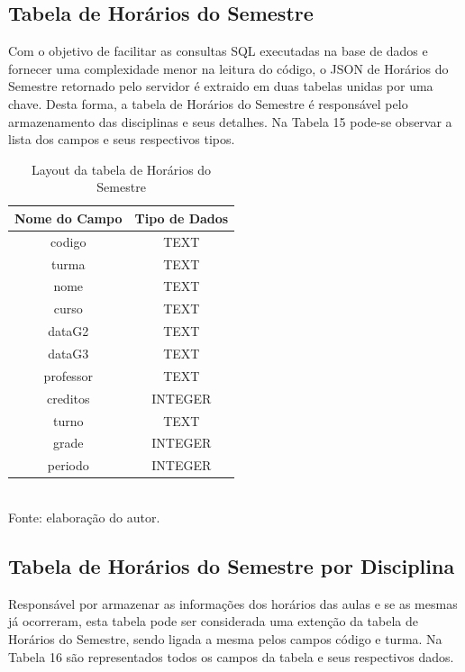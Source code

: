 \subsection{Tabela de Horários do Semestre}
Com o objetivo de facilitar as consultas SQL executadas na base de dados e fornecer uma complexidade menor na leitura do código, o JSON de Horários do Semestre retornado pelo servidor é extraido em duas tabelas unidas por uma chave. Desta forma, a tabela de Horários do Semestre é responsável pelo armazenamento das disciplinas e seus detalhes. Na Tabela 15 pode-se observar a lista dos campos e seus respectivos tipos.

\begin{table}[!hbt]
\centering
\caption[Aplicação - Tabela de Horários do Semestre]{Layout da tabela de Horários do Semestre}
\vspace{3mm}
\begin{tabular}{c|c}\hline
\textbf{Nome do Campo} & \textbf{Tipo de Dados} \\ \hline
codigo                 & TEXT                   \\ \hline
turma                  & TEXT                   \\ \hline
nome                   & TEXT                   \\ \hline
curso                  & TEXT                   \\ \hline
dataG2                 & TEXT                   \\ \hline
dataG3                 & TEXT                   \\ \hline
professor              & TEXT                   \\ \hline
creditos               & INTEGER                \\ \hline
turno                  & TEXT                   \\ \hline
grade                  & INTEGER                \\ \hline
periodo                & INTEGER                \\ \hline
\end{tabular}
\\ Fonte: elaboração do autor.
\end{table}

\subsection{Tabela de Horários do Semestre por Disciplina}
Responsável por armazenar as informações dos horários das aulas e se as mesmas já ocorreram, esta tabela pode ser considerada uma extenção da tabela de Horários do Semestre, sendo ligada a mesma pelos campos código e turma. Na Tabela 16 são representados todos os campos da tabela e seus respectivos dados.

